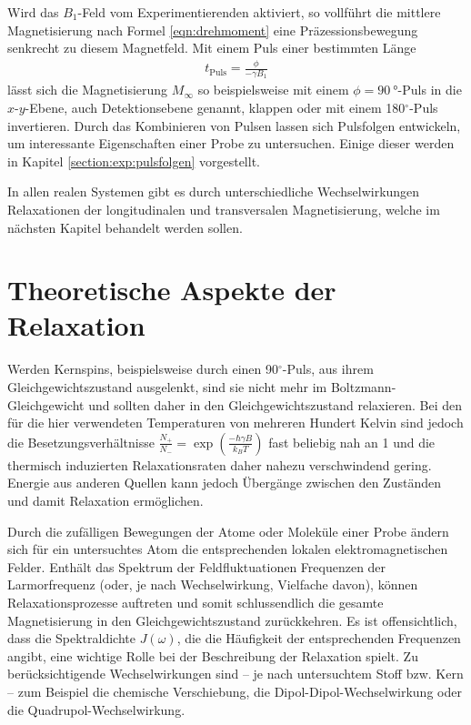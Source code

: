 Wird das $B_1$-Feld vom Experimentierenden aktiviert, so vollführt die mittlere Magnetisierung nach Formel \eqref{eqn:drehmoment} eine Präzessionsbewegung senkrecht zu diesem Magnetfeld. Mit einem Puls einer bestimmten Länge
\begin{align}
	t_\text{Puls} = \frac{\phi}{- \gamma B_1} \label{eqn:theo:pulslaenge}
\end{align}
lässt sich die Magnetisierung $M_\infty$ so beispielsweise mit einem $\phi = \SI{90}{\degree}$-Puls in die $x$-$y$-Ebene, auch Detektionsebene genannt, klappen oder mit einem 180$^\circ$-Puls invertieren. Durch das Kombinieren von Pulsen lassen sich Pulsfolgen entwickeln, um interessante Eigenschaften einer Probe zu untersuchen. Einige dieser werden in Kapitel \ref{section:exp:pulsfolgen} vorgestellt.

In allen realen Systemen gibt es durch unterschiedliche Wechselwirkungen Relaxationen der longitudinalen und transversalen Magnetisierung, welche im nächsten Kapitel behandelt werden sollen.



\section{Theoretische Aspekte der Relaxation} \label{section:theo:relax}

Werden Kernspins, beispielsweise durch einen 90$^\circ$-Puls, aus ihrem Gleichgewichtszustand ausgelenkt, sind sie nicht mehr im Boltzmann-Gleichgewicht und sollten daher in den Gleichgewichtszustand relaxieren. Bei den für die hier verwendeten Temperaturen von mehreren Hundert Kelvin sind jedoch die Besetzungsverhältnisse $\frac{N_+}{N_-} = \exp (\frac{- \hbar \gamma B}{k_B T})$ fast beliebig nah an 1 und die thermisch induzierten Relaxationsraten daher nahezu verschwindend gering. Energie aus anderen Quellen kann jedoch Übergänge zwischen den Zuständen und damit Relaxation ermöglichen.

Durch die zufälligen Bewegungen der Atome oder Moleküle einer Probe ändern sich für ein untersuchtes Atom die entsprechenden lokalen elektromagnetischen Felder. Enthält das Spektrum der Feldfluktuationen Frequenzen der Larmorfrequenz (oder, je nach Wechselwirkung, Vielfache davon), können Relaxationsprozesse auftreten und somit schlussendlich die gesamte Magnetisierung in den Gleichgewichtszustand zurückkehren. Es ist offensichtlich, dass die Spektraldichte $J(\omega)$, die die Häufigkeit der entsprechenden Frequenzen angibt, eine wichtige Rolle bei der Beschreibung der Relaxation spielt. Zu berücksichtigende Wechselwirkungen sind -- je nach untersuchtem Stoff bzw. Kern -- zum Beispiel die chemische Verschiebung, die Dipol-Dipol-Wechselwirkung oder die Quadrupol-Wechselwirkung.

